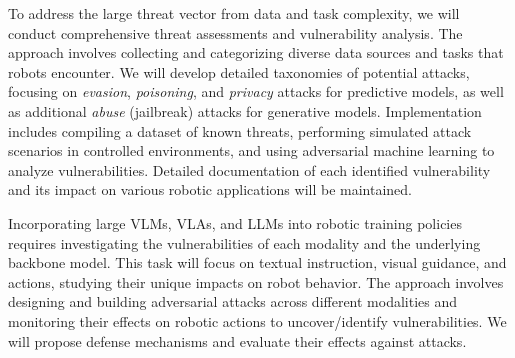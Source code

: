 { 
To address the large threat vector from data and task complexity, we will conduct comprehensive threat assessments and vulnerability analysis. The approach involves collecting and categorizing diverse data sources and tasks that robots encounter. We will develop detailed taxonomies of potential attacks, focusing on \textit{evasion}, \textit{poisoning}, and \textit{privacy} attacks for predictive models, as well as additional \textit{abuse} (\eg jailbreak) attacks for generative models. Implementation includes compiling a dataset of known threats, performing simulated attack scenarios in controlled environments, and using adversarial machine learning to analyze vulnerabilities. Detailed documentation of each identified vulnerability and its impact on various robotic applications will be maintained. 


Incorporating large VLMs, VLAs, and LLMs into robotic training policies requires investigating the vulnerabilities of each modality and the underlying backbone model. 
This task will focus on textual instruction, visual guidance, and actions, studying their unique impacts on robot behavior. 
The approach involves designing and building adversarial attacks across different modalities and monitoring their effects on robotic actions to uncover/identify vulnerabilities. 
We will propose defense mechanisms and evaluate their effects against attacks.



}
